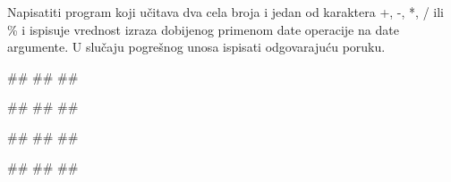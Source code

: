 \begin{Exercise}[label=p1.2_14] 
Napisatiti program koji učitava dva cela broja i jedan od karaktera +, -, *, / ili \% i ispisuje vrednost izraza dobijenog primenom date operacije na date argumente. U slučaju pogrešnog unosa ispisati odgovarajuću poruku. 

 \begin{miditest}
\begin{upotreba}{1}
#\naslovInt#
##
##
\end{upotreba}
\end{miditest}
\begin{miditest}
\begin{upotreba}{2}
#\naslovInt#
##
##
\end{upotreba}
\end{miditest}

\begin{miditest}
\begin{upotreba}{3}
#\naslovInt#
##
##
\end{upotreba}
\end{miditest}
\begin{miditest}
\begin{upotreba}{4}
#\naslovInt#
##
##
\end{upotreba}
\end{miditest}

\end{Exercise}
\begin{Answer}[ref=p1.2_14]
\end{Answer}


